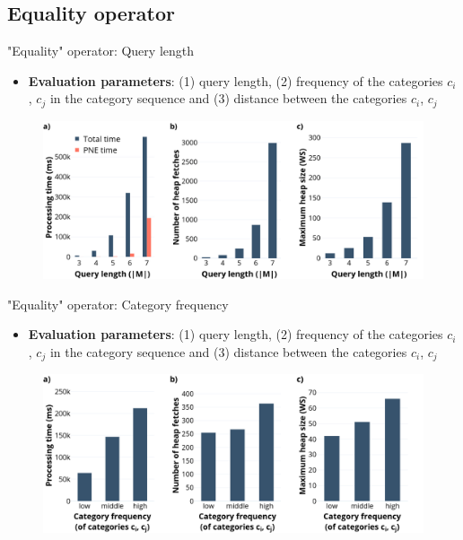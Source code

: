 \documentclass[18pt]{beamer}
\begin{document}
	\subsection{Equality operator}
		\begin{frame}{"Equality" operator: Query length}
		
			\begin{itemize}
				\item \textbf{Evaluation parameters}: \textcolor{kit}{(1) query length}, (2) frequency of the categories $c_i$, $c_j$ in the category sequence and (3) distance between the categories $c_i$, $c_j$
			\end{itemize}
		
			\begin{figure}[h]
				\includegraphics[scale=0.275]{eo_length_orange.png}
			\end{figure}
		
		\end{frame}
	
		\begin{frame}{"Equality" operator: Category frequency}
		
			\begin{itemize}
				\item \textbf{Evaluation parameters}: (1) query length, \textcolor{kit}{(2) frequency of the categories $c_i$, $c_j$ in the category sequence} and (3) distance between the categories $c_i$, $c_j$
			\end{itemize}
			
			\begin{figure}[h]
				\includegraphics[scale=0.275]{eo_frequency.png}
			\end{figure}
		
		\end{frame}
	
\end{document}
